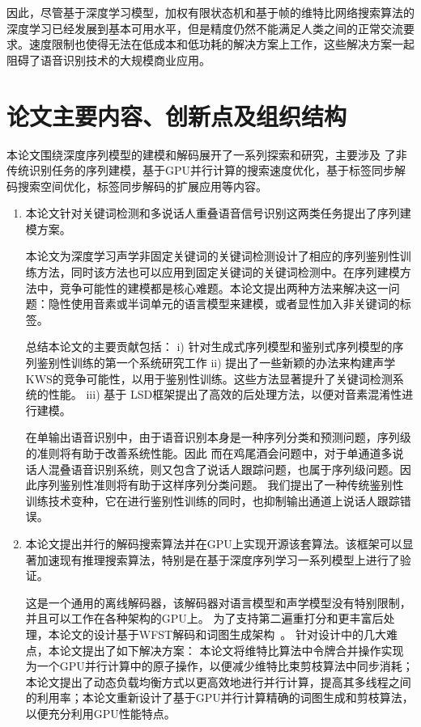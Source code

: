 因此，尽管基于深度学习模型，加权有限状态机和基于帧的维特比网络搜索算法的深度学习已经发展到基本可用水平，但是精度仍然不能满足人类之间的正常交流要求。速度限制也使得无法在低成本和低功耗的解决方案上工作，这些解决方案一起阻碍了语音识别技术的大规模商业应用。


\section{论文主要内容、创新点及组织结构}
\label{chap:intro0-thesis}


本论文围绕深度序列模型的建模和解码展开了一系列探索和研究，主要涉及
了非传统识别任务的序列建模，基于GPU并行计算的搜索速度优化，基于标签同步解码搜索空间优化，标签同步解码的扩展应用等内容。

\begin{enumerate}
\item 本论文针对关键词检测和多说话人重叠语音信号识别这两类任务提出了序列建模方案。

本论文为深度学习声学非固定关键词的关键词检测设计了相应的序列鉴别性训练方法，同时该方法也可以应用到固定关键词的关键词检测中。在序列建模方法中，竞争可能性的建模都是核心难题。本论文提出两种方法来解决这一问题：隐性使用音素或半词单元的语言模型来建模，或者显性加入非关键词的标签。

总结本论文的主要贡献包括：
i) 针对生成式序列模型和鉴别式序列模型的序列鉴别性训练的第一个系统研究工作
ii) 提出了一些新颖的办法来构建声学KWS的竞争可能性，以用于鉴别性训练。这些方法显著提升了关键词检测系统的性能。
iii) 基于 LSD框架提出了高效的后处理方法，以便对音素混淆性进行建模。

在单输出语音识别中，由于语音识别本身是一种序列分类和预测问题，序列级的准则将有助于改善系统性能。因此
而在鸡尾酒会问题中，对于单通道多说话人混叠语音识别系统，则又包含了说话人跟踪问题，也属于序列级问题。因此序列鉴别性准则将有助于这样序列分类问题。
我们提出了一种传统鉴别性训练技术变种，它在进行鉴别性训练的同时，也抑制输出通道上说话人跟踪错误。

    \item 
本论文提出并行的解码搜索算法并在GPU上实现开源该套算法。该框架可以显著加速现有推理搜索算法，特别是在基于深度序列学习一系列模型上进行了验证。

这是一个通用的离线解码器，该解码器对语言模型和声学模型没有特别限制，并且可以工作在各种架构的GPU上。
为了支持第二遍重打分和更丰富后处理，本论文的设计基于WFST解码和词图生成架构~\cite{povey2012generating}。
针对设计中的几大难点，本论文提出了如下解决方案：
本论文将维特比算法中令牌合并操作实现为一个GPU并行计算中的原子操作，以便减少维特比束剪枝算法中同步消耗；本论文提出了动态负载均衡方式以更高效地进行并行计算，提高其多线程之间的利用率；本论文重新设计了基于GPU并行计算精确的词图生成和剪枝算法，以便充分利用GPU性能特点。


\end{enumerate}
